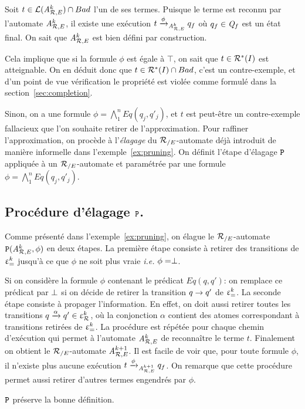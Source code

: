 Soit $t \in \mathcal{L}({\mathit A}_{\mathcal R,E}^k) \cap Bad$ l'un de ses termes. 
Puisque le terme est reconnu par l'automate ${\mathit A}_{\mathcal R,E}^k$, il existe
une exécution $t \xrightarrow{\phi}_{{\mathit A}_{\mathcal R,E}^k} q_f$ où $q_f \in \mathit Q_f$ est un état final.
On sait que ${\mathit A}_{\mathcal R,E}^k$ est bien défini par construction.

Cela implique que si la formule $\phi$ est égale à $\top$, on sait que $t \in \mathcal R^*(I)$ est atteignable.
On en déduit donc que $t \in \mathcal R^*(I) \cap Bad$, c'est un contre-exemple, et d'un point de vue
vérification le propriété est violée comme formulé dans la section~\ref{sec:completion}.

Sinon, on a une formule $\phi = \bigwedge_1^n Eq(q_j, q'_j)$, et $t$ est peut-être un contre-exemple 
fallacieux que l'on souhaite retirer de l'approximation.
Pour raffiner l'approximation, on procède à l'\emph{élagage} du ${\mathcal R_{/E}}$-automate
déjà introduit de manière informelle dans l'exemple~\ref{ex:pruning}. On définit
l'étape d'élagage $\mathtt{P}$ appliquée à un ${\mathcal R_{/E}}$-automate et paramétrée par 
une formule $\phi = \bigwedge_1^n Eq(q_j, q'_j)$.



\subsection{Procédure d'élagage $\mathtt{P}$.}
\label{subsec:refinementstep}
Comme présenté dans l'exemple~\ref{ex:pruning}, on élague le
${\mathcal R_{/E}}$-automate $\mathtt{P}({\mathit A}_{\mathcal R,E}^k, \phi)$ en deux étapes. La première étape
consiste à retirer des transitions de $\upvarepsilon_{=}^k$ jusqu'à ce que $\phi$
ne soit plus vraie {\em i.e.} $\phi = \perp$.

Si on considère la formule $\phi$ contenant le prédicat $Eq(q,q')$: on
remplace ce prédicat par $\perp$ si on décide de retirer la
transition $q \rightarrow q'$ de $\upvarepsilon_{=}^k$. La seconde étape consiste à
propager l'information.  En effet, on doit aussi retirer toutes les
transitions $q \xrightarrow{\alpha} q' \in \upvarepsilon_{\mathcal R}^k$, où la conjonction $\alpha$
contient des atomes correspondant à transitions retirées de $\upvarepsilon_{=}^k$.
La procédure est répétée pour chaque chemin d'exécution qui permet à
l'automate ${\mathit A}_{\mathcal R,E}^k$ de reconnaître le terme $t$. Finalement on
obtient le ${\mathcal R_{/E}}$-automate ${\mathit A}_{\mathcal R,E}^{k+1}$.  Il est facile de voir que,
pour toute formule $\phi$, il n'existe plus aucune exécution $t
\xrightarrow{\phi}_{{\mathit A}_{\mathcal R,E}^{k+1}} q_f$.  On remarque que cette procédure
permet aussi retirer d'autres termes engendrés par $\phi$.

\begin{property}
   $\mathtt{P}$ préserve la bonne définition.
\end{property}

